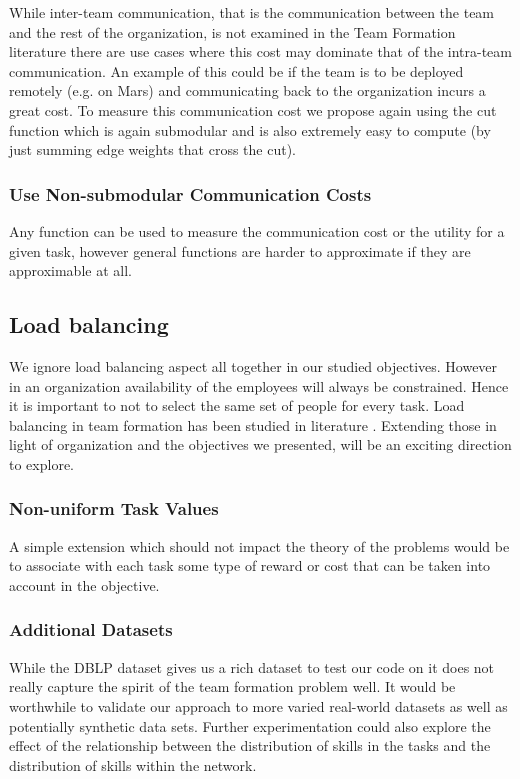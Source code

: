 While inter-team communication, that is the communication between the team and the rest of the organization, is not examined in the Team Formation literature there are use cases where this cost may dominate that of the intra-team communication. An example of this could be if the team is to be deployed remotely (e.g. on Mars) and communicating back to the organization incurs a great cost. To measure this communication cost we propose again using the cut function which is again submodular and is also extremely easy to compute (by just summing edge weights that cross the cut).

\subsubsection{Use Non-submodular Communication Costs}

Any function can be used to measure the communication cost or the utility for a given task, however general functions are harder to approximate if they are approximable at all. 

\subsection{Load balancing}

We ignore load balancing aspect all together in our studied objectives. However in an organization availability of the employees will always be constrained. Hence it is important to not to select the same set of people for every task. Load balancing in team formation has been studied in literature \cite{wang2016ustf,liu2017simple}. Extending those in light of organization and the objectives we presented, will be an exciting direction to explore. 

\subsubsection{Non-uniform Task Values}

A simple extension which should not impact the theory of the problems would be to associate with each task some type of reward or cost that can be taken into account in the objective. 

\subsubsection{Additional Datasets}

While the DBLP dataset gives us a rich dataset to test our code on it does not really capture the spirit of the team formation problem well. It would be worthwhile to validate our approach to more varied real-world datasets as well as potentially synthetic data sets. Further experimentation could also explore the effect of the relationship between the distribution of skills in the tasks and the distribution of skills within the network. 

